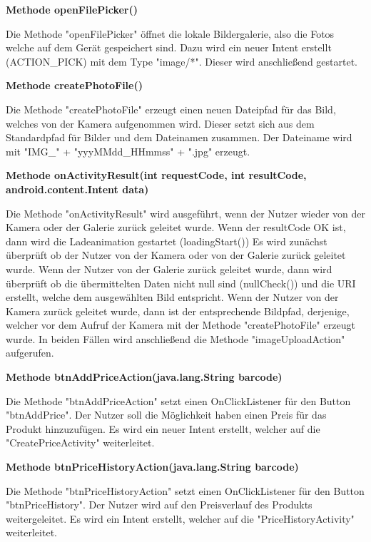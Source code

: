 \documentclass{scrartcl}
\begin{document}
\noindent\textbf{Methode openFilePicker()} 

\noindent Die Methode "openFilePicker" öffnet die lokale Bildergalerie, also die Fotos welche auf dem Gerät gespeichert sind. Dazu wird ein neuer Intent erstellt (ACTION\_PICK) mit dem Type "image/*". Dieser wird anschließend gestartet. \newline 

\noindent\textbf{Methode createPhotoFile()} 

\noindent Die Methode "createPhotoFile" erzeugt einen neuen Dateipfad für das Bild, welches von der Kamera aufgenommen wird. Dieser setzt sich aus dem Standardpfad für Bilder und dem Dateinamen zusammen. Der Dateiname wird mit "IMG\_" + "yyyMMdd\_HHmmss" + ".jpg" erzeugt. \newline 

\noindent\textbf{Methode onActivityResult(int requestCode, \newline int resultCode, android.content.Intent data)} 

\noindent Die Methode "onActivityResult" wird ausgeführt, wenn der Nutzer wieder von der Kamera oder der Galerie zurück geleitet wurde. Wenn der resultCode OK ist, dann wird die Ladeanimation gestartet (loadingStart()) Es wird zunächst überprüft ob der Nutzer von der Kamera oder von der Galerie zurück geleitet wurde. Wenn der Nutzer von der Galerie zurück geleitet wurde, dann wird überprüft ob die übermittelten Daten nicht null sind (nullCheck()) und die URI erstellt, welche dem ausgewählten Bild entspricht. Wenn der Nutzer von der Kamera zurück geleitet wurde, dann ist der entsprechende Bildpfad, derjenige, welcher vor dem Aufruf der Kamera mit der Methode "createPhotoFile" erzeugt wurde. In beiden Fällen wird anschließend die Methode "imageUploadAction" aufgerufen. \newline 

\noindent\textbf{Methode btnAddPriceAction(java.lang.String barcode)} 

\noindent Die Methode "btnAddPriceAction" setzt einen OnClickListener für den Button "btnAddPrice". Der Nutzer soll die Möglichkeit haben einen Preis für das Produkt hinzuzufügen. Es wird ein neuer Intent erstellt, welcher auf die "CreatePriceActivity" weiterleitet. \newline

\noindent\textbf{Methode btnPriceHistoryAction(java.lang.String barcode)} 

\noindent Die Methode "btnPriceHistoryAction" setzt einen OnClickListener für den Button "btnPriceHistory". Der Nutzer wird auf den Preisverlauf des Produkts weitergeleitet. Es wird ein Intent erstellt, welcher auf die "PriceHistoryActivity" weiterleitet. \newline
\end{document}
